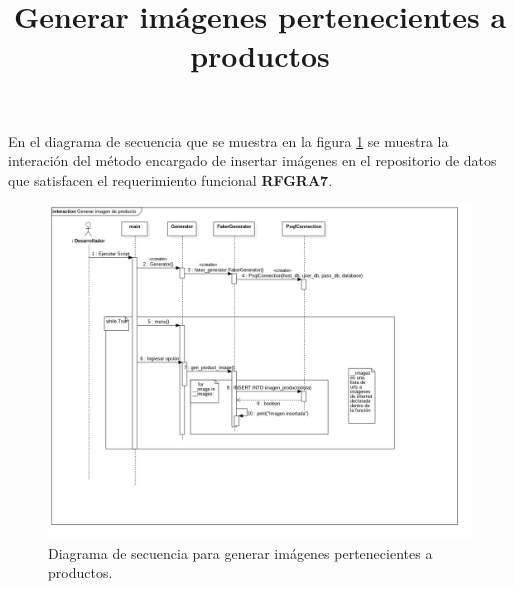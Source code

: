 \title{\textbf{Generar imágenes pertenecientes a productos\\}}
En el diagrama de secuencia que se muestra en la figura \ref{image:DSGenerarImagenesAProductos} se muestra la interación del método encargado de insertar imágenes en el repositorio de datos que satisfacen el requerimiento funcional \textbf{RFGRA7}.
\FloatBarrier
\begin{figure}[htbp!]
		\centering
			\includegraphics[width=1.1 \textwidth]{imagenes/DSRuben/gen_product_image_generator}
		\caption{Diagrama de secuencia para generar imágenes pertenecientes a productos.}
		\label{image:DSGenerarImagenesAProductos}
\end{figure}
\FloatBarrier





